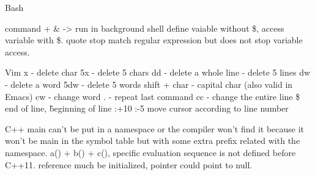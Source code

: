 \documentclass[a4paper]{tufte-handout}
\begin{document}
Bash

command + \& -> run in background \newline
shell define vaiable without \$, access variable with \$.
quote stop match regular expression but does not stop variable access.

Vim\newline
x - delete char\newline
5x - delete 5 chars\newline
dd - delete a whole line \newline
5dd - delete 5 lines \newline
dw - delete a word \newline
5dw - delete 5 words \newline
shift + char - capital char (also valid in Emacs) \newline
cw - change word \newline
. - repeat last command \newline
cc - change the entire line \newline
\$ end of line, \^ beginning of line \newline
:+10 :-5 move cursor according to line number \newline

C++\newline
main can't be put in a namespace or the compiler won't find it because it won't be main in the symbol table but with some extra prefix related with the namespace.\newline
a() + b() + c(), specific evaluation sequence is not defined before C++11.\newline
reference much be initialized, pointer could point to null.
\end{document}
